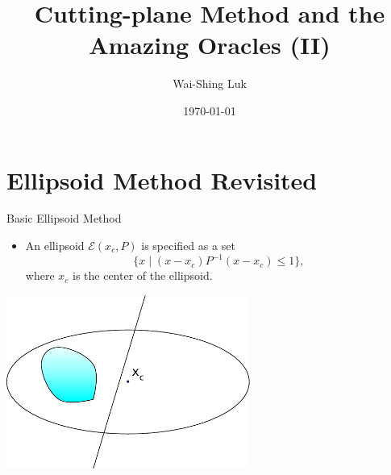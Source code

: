 \documentclass[10pt,ignorenonframetext,serif,onlymath]{beamer}
\title{Cutting-plane Method and the Amazing Oracles (II)}
\author{Wai-Shing Luk}
\institute{Fudan University}
\date{\today}
\providecommand{\tightlist}{%
  \setlength{\itemsep}{0pt}\setlength{\parskip}{0pt}}
\begin{document}
\frame{\titlepage}

\begin{frame}
\tableofcontents[hideallsubsections]
\end{frame}
\hypertarget{ellipsoid-method-revisited}{%
\section{Ellipsoid Method Revisited}\label{ellipsoid-method-revisited}}

\begin{frame}{Basic Ellipsoid Method}
\protect\hypertarget{basic-ellipsoid-method}{}

\begin{itemize}
\tightlist
\item
  An ellipsoid \(\mathcal{E}(x_c, P)\) is specified as a set
  \[\{x \mid (x-x_c)P^{-1}(x-x_c) \leq 1 \},\] where \(x_c\) is the
  center of the ellipsoid.
\end{itemize}

\includegraphics[width=0.6\textwidth,height=\textheight]{ellipsoid.files/ellipsoid.pdf}

\end{frame}
\end{document}
